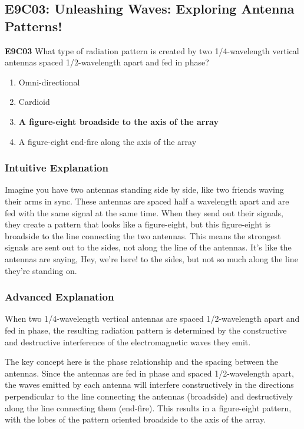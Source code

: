 \subsection{E9C03: Unleashing Waves: Exploring Antenna Patterns!}

\begin{tcolorbox}[colback=gray!10!white,colframe=black!75!black,title=Question E9C03]
\textbf{E9C03} What type of radiation pattern is created by two 1/4-wavelength vertical antennas spaced 1/2-wavelength apart and fed in phase?
\begin{enumerate}[label=\Alph*.]
    \item Omni-directional
    \item Cardioid
    \item \textbf{A figure-eight broadside to the axis of the array}
    \item A figure-eight end-fire along the axis of the array
\end{enumerate}
\end{tcolorbox}

\subsubsection{Intuitive Explanation}
Imagine you have two antennas standing side by side, like two friends waving their arms in sync. These antennas are spaced half a wavelength apart and are fed with the same signal at the same time. When they send out their signals, they create a pattern that looks like a figure-eight, but this figure-eight is broadside to the line connecting the two antennas. This means the strongest signals are sent out to the sides, not along the line of the antennas. It's like the antennas are saying, Hey, we're here! to the sides, but not so much along the line they're standing on.

\subsubsection{Advanced Explanation}
When two 1/4-wavelength vertical antennas are spaced 1/2-wavelength apart and fed in phase, the resulting radiation pattern is determined by the constructive and destructive interference of the electromagnetic waves they emit. 

The key concept here is the phase relationship and the spacing between the antennas. Since the antennas are fed in phase and spaced 1/2-wavelength apart, the waves emitted by each antenna will interfere constructively in the directions perpendicular to the line connecting the antennas (broadside) and destructively along the line connecting them (end-fire). This results in a figure-eight pattern, with the lobes of the pattern oriented broadside to the axis of the array.

